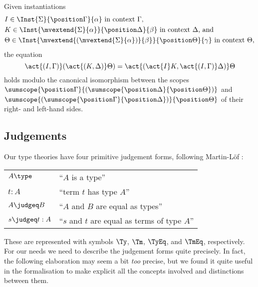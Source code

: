\begin{propositionwithqed}
  Given instantiations 
  \begin{align*}
    &\text{$I \in \Inst{\Sigma}{\position \Gamma}{\alpha}$ in context $\Gamma$,}\\
    &\text{$K \in \Inst{\mvextend{\Sigma}{\alpha}}{\position \Delta}{\beta}$ in context $\Delta$, and}\\
    &\text{$\Theta \in \Inst{\mvextend{(\mvextend{\Sigma}{\alpha})}{\beta}}{\position \Theta}{\gamma}$ in context $\Theta$},
  \end{align*}
  the equation
  \begin{equation*}
    \act{(I,\Gamma)} (\act{(K,\Delta)} \Theta) =
    \act{(\act{I}K, \act{(I,\Gamma)} \Delta)} \Theta
  \end{equation*}
  holds modulo the canonical isomorphism between the scopes
  $\sumscope{\position \Gamma}{(\sumscope{\position \Delta}{\position \Theta})}$ and $\sumscope{(\sumscope{\position \Gamma}{\position \Delta})}{\position \Theta}$ of their right- and left-hand sides.
\end{propositionwithqed}

\subsection{Judgements}

Our type theories have four primitive judgement forms, following Martin-Löf \citep{martin-lof:bibliopolis}:
%
\begin{center}
\begin{tabular}{ll}
  $A \type$           &\qquad ``$A$ is a type'' \\
  $t : A$             &\qquad ``term $t$ has type $A$'' \\
  $A \judgeq B$       &\qquad ``$A$ and $B$ are equal as types''  \\
  $s \judgeq t : A$   &\qquad ``$s$ and $t$ are equal as terms of type $A$''
\end{tabular}
\end{center}
%
These are represented with symbols $\Ty$, $\Tm$, $\TyEq$, and $\TmEq$, respectively.
%
For our needs we need to describe the judgement forms quite precisely. In fact, the following elaboration may seem a bit \emph{too} precise, but we found it quite useful in the formalisation to make explicit all the concepts involved and distinctions between them.

